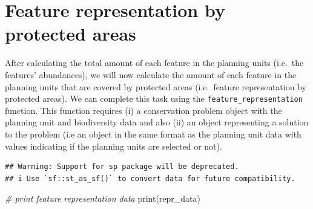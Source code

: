 \documentclass[
  12pt,
]{book}
\newenvironment{Shaded}{\begin{snugshade}}{\end{snugshade}}
\newcommand{\CommentTok}[1]{\textcolor[rgb]{0.56,0.35,0.01}{\textit{#1}}}
\newcommand{\FunctionTok}[1]{\textcolor[rgb]{0.00,0.00,0.00}{#1}}
\newcommand{\NormalTok}[1]{#1}
\newcommand{\OtherTok}[1]{\textcolor[rgb]{0.56,0.35,0.01}{#1}}
\newcommand{\SpecialCharTok}[1]{\textcolor[rgb]{0.00,0.00,0.00}{#1}}
\newcommand{\StringTok}[1]{\textcolor[rgb]{0.31,0.60,0.02}{#1}}
\begin{document}
\hypertarget{feature-representation-by-protected-areas}{%
\section{Feature representation by protected areas}\label{feature-representation-by-protected-areas}}

After calculating the total amount of each feature in the planning units (i.e.~the features' abundances), we will now calculate the amount of each feature in the planning units that are covered by protected areas (i.e.~feature representation by protected areas). We can complete this task using the \texttt{feature\_representation} function. This function requires (i) a conservation problem object with the planning unit and biodiversity data and also (ii) an object representing a solution to the problem (i.e an object in the same format as the planning unit data with values indicating if the planning units are selected or not).

\begin{Shaded}
\end{Shaded}

\begin{verbatim}
## Warning: Support for sp package will be deprecated.
## i Use `sf::st_as_sf()` to convert data for future compatibility.
\end{verbatim}

\begin{Shaded}
\begin{Highlighting}[]
\CommentTok{\# print feature representation data}
\FunctionTok{print}\NormalTok{(repr\_data)}
\end{Highlighting}
\end{Shaded}
\end{document}
